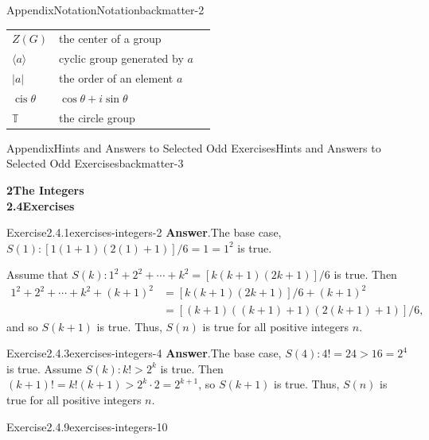 \documentclass[oneside,10pt,]{book}
\newcommand{\blocktitlefont}{\relax}
\numberwithin{equation}{section}
\newcommand{\cis}{\operatorname{cis}}
\newcommand{\gt}{>}
\begin{document}
\begin{appendixptx}{Appendix}{Notation}{}{Notation}{}{}{backmatter-2}
\begin{longtable}[l]{lp{}r}
\(Z(G)\)&the center of a group&\pageref{exercises-groups-49-1-1-7}\\
\(\langle a \rangle\)&cyclic group generated by \(a\)&\pageref{theorem-cyclic-subgroup-1-1-9}\\
\(|a|\)&the order of an element \(a\)&\pageref{cyclic-4-7-24}\\
\(\cis \theta\)&\(\cos \theta + i \sin \theta\)&\pageref{cyclic-6-9-14}\\
\(\mathbb T\)&the circle group&\pageref{cyclic-6-16-9}\\
\end{longtable}
\end{appendixptx}
%
%
\typeout{************************************************}
\typeout{************************************************}
%
\begin{solutions-chapter}{Appendix}{Hints and Answers to Selected Odd Exercises}{}{Hints and Answers to Selected Odd Exercises}{}{}{backmatter-3}
\par\medskip
\noindent\textbf{\Large{}2\space\textperiodcentered\space{}The Integers\\
2.4\space\textperiodcentered\space{}Exercises}
\begin{divisionsolution}{Exercise}{2.4.1}{}{exercises-integers-2}%
\noindent\textbf{\blocktitlefont Answer}.\hypertarget{exercises-integers-2-2-back}{}\quad{}The base case, \(S(1): [1(1 + 1)(2(1) + 1)]/6 = 1 = 1^2\) is true.%
\par
Assume that \(S(k): 1^2 + 2^2 + \cdots + k^2 = [k(k + 1)(2k + 1)]/6\) is true. Then%
\begin{align*}
1^2 + 2^2 + \cdots + k^2 + (k + 1)^2 & = [k(k + 1)(2k + 1)]/6 + (k + 1)^2\\
& = [(k + 1)((k + 1) + 1)(2(k + 1) + 1)]/6,
\end{align*}
and so \(S(k + 1)\) is true. Thus, \(S(n)\) is true for all positive integers \(n\).%
\end{divisionsolution}%
\begin{divisionsolution}{Exercise}{2.4.3}{}{exercises-integers-4}%
\noindent\textbf{\blocktitlefont Answer}.\hypertarget{exercises-integers-4-2-back}{}\quad{}The base case, \(S(4): 4! = 24 \gt 16 =2^4\) is true. Assume \(S(k): k! \gt 2^k\) is true. Then \((k + 1)! = k! (k + 1) \gt 2^k \cdot 2 = 2^{k + 1}\), so \(S(k + 1)\) is true. Thus, \(S(n)\) is true for all positive integers \(n\).%
\end{divisionsolution}%
\begin{divisionsolution}{Exercise}{2.4.9}{}{exercises-integers-10}%

\end{divisionsolution}
\end{solutions-chapter}
\end{document}

